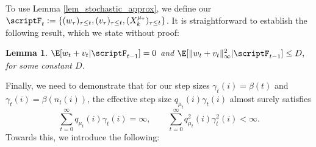 \documentclass[12pt]{article}
\newtheorem{lemma}{Lemma}
\begin{document}
To use Lemma \ref{lem_stochastic_approx}, we define our $\scriptF_t := \{(w_\tau)_{\tau \leq t}, (v_\tau)_{\tau \leq t}, (X_k^{\mu_\tau})_{\tau \leq t} \}$. It is straightforward to establish the following result, which we state without proof: 

\begin{lemma}\label{lem_noise}
$\E[w_t +v_t | \scriptF_{t-1}] = 0$ and $\E[\|w_t + v_t\|_\infty^2 | \scriptF_{t-1}] \leq D,$ for some constant $D$.
\end{lemma}

Finally, we need to demonstrate that for our step sizes $\gamma_t(i)=\beta(t)$ and $\gamma_t(i)=\beta(n_t(i))$, the effective step size $q_{\mu_t}(i)\gamma_t(i)$ almost surely satisfies 
\begin{equation}
\sum_{t=0}^\infty q_{\mu_t}(i)\gamma_t(i) = \infty, \qquad \sum_{t=0}^\infty q_{\mu_t}^2(i)\gamma_t^2(i) < \infty.\label{eq:effstep}
\end{equation}
Towards this, we introduce the following:
\end{document}
